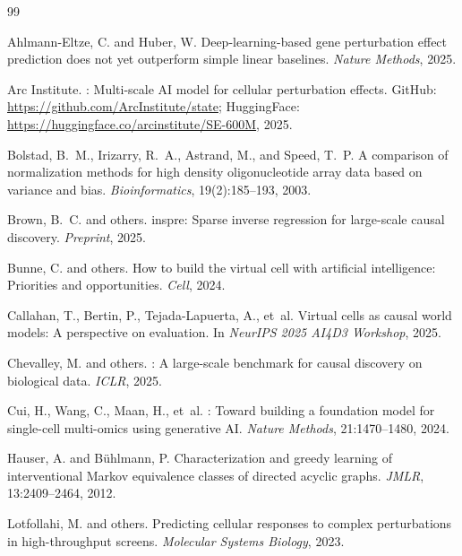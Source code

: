\documentclass{article}
\begin{document}
\begin{thebibliography}{99}

Ahlmann-Eltze, C. and Huber, W.
\newblock Deep-learning-based gene perturbation effect prediction does not yet outperform simple linear baselines.
\newblock \emph{Nature Methods}, 2025.

{Arc Institute}.
: Multi-scale {AI} model for cellular perturbation effects.
\newblock GitHub: \url{https://github.com/ArcInstitute/state}; HuggingFace: \url{https://huggingface.co/arcinstitute/SE-600M}, 2025.

Bolstad, B.~M., Irizarry, R.~A., Astrand, M., and Speed, T.~P.
\newblock A comparison of normalization methods for high density oligonucleotide array data based on variance and bias.
\newblock \emph{Bioinformatics}, 19(2):185--193, 2003.

Brown, B.~C. and others.
\newblock inspre: Sparse inverse regression for large-scale causal discovery.
\newblock \emph{Preprint}, 2025.

Bunne, C. and others.
\newblock How to build the virtual cell with artificial intelligence: Priorities and opportunities.
\newblock \emph{Cell}, 2024.

Callahan, T., Bertin, P., Tejada-Lapuerta, A., et~al.
\newblock Virtual cells as causal world models: A perspective on evaluation.
\newblock In \emph{NeurIPS 2025 AI4D3 Workshop}, 2025.

Chevalley, M. and others.
: A large-scale benchmark for causal discovery on biological data.
\newblock \emph{ICLR}, 2025.

Cui, H., Wang, C., Maan, H., et~al.
: Toward building a foundation model for single-cell multi-omics using generative {AI}.
\newblock \emph{Nature Methods}, 21:1470--1480, 2024.

Hauser, A. and B\"uhlmann, P.
\newblock Characterization and greedy learning of interventional {M}arkov equivalence classes of directed acyclic graphs.
\newblock \emph{JMLR}, 13:2409--2464, 2012.

Lotfollahi, M. and others.
\newblock Predicting cellular responses to complex perturbations in high-throughput screens.
\newblock \emph{Molecular Systems Biology}, 2023.


\end{thebibliography}
\end{document}
